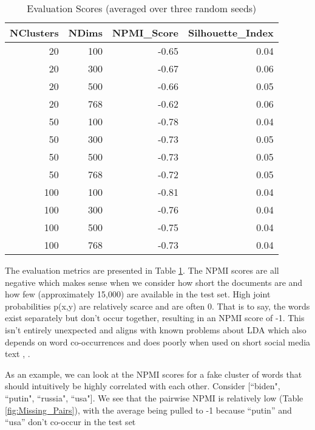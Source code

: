 \documentclass [11pt, proquest] {uwthesis}[2020/02/24]
\begin{document}
\begin{table}
\centering
\caption{Evaluation Scores (averaged over three random seeds)}
\begin{tabular}{rrrr}
\toprule
 NClusters &  NDims &  NPMI\_Score &  Silhouette\_Index \\
\midrule
        20 &    100 &       -0.65 &              0.04 \\
        20 &    300 &       -0.67 &              0.06 \\
        20 &    500 &       -0.66 &              0.05 \\
        20 &    768 &       -0.62 &              0.06 \\
        50 &    100 &       -0.78 &              0.04 \\
        50 &    300 &       -0.73 &              0.05 \\
        50 &    500 &       -0.73 &              0.05 \\
        50 &    768 &       -0.72 &              0.05 \\
       100 &    100 &       -0.81 &              0.04 \\
       100 &    300 &       -0.76 &              0.04 \\
       100 &    500 &       -0.75 &              0.04 \\
       100 &    768 &       -0.73 &              0.04 \\
\bottomrule
\end{tabular}
\label{fig:Cluster_Evaluation}
\end{table}



The evaluation metrics are presented in Table \ref{fig:Cluster_Evaluation}. The NPMI scores are all negative which makes sense when we consider how short the documents are and how few (approximately 15,000) are available in the test set. High joint probabilities p(x,y) are relatively scarce and are often 0.  That is to say, the words exist separately but don’t occur together, resulting in an NPMI score of -1. This isn't entirely unexpected and aligns with known problems about LDA which also depends on word co-occurrences and does poorly when used on short social media text \citep{chen2016short}, \citep{pang2016mr}.

As an example, we can look at the NPMI scores for a fake cluster of words that should intuitively be highly correlated with each other. Consider [``biden", ``putin", ``russia", ``usa"]. We see that the pairwise NPMI is relatively low (Table \ref{fig:Missing_Pairs}), with the average being pulled to -1 because “putin” and “usa” don’t co-occur in the test set
\end{document}
